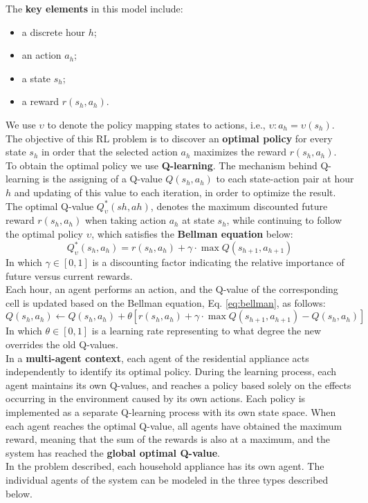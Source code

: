 The \textbf{key elements} in this model include:
\begin{itemize}
    \item a discrete hour $h$;
    \item an action $a_h$;
    \item a state $s_h$;
    \item a reward $r(s_h, a_h)$.
\end{itemize}
We use $\upsilon$ to denote the policy mapping states to actions, i.e., $\upsilon:a_h=\upsilon(s_h)$. The objective of this RL problem is to discover an \textbf{optimal policy} for every state $s_h$ in order that the selected action $a_h$ maximizes the reward $r(s_h, a_h)$.\\
To obtain the optimal policy we use \textbf{Q-learning}. The mechanism behind Q-learning is the assigning of a Q-value $Q(s_h, a_h)$ to each state-action pair at hour $h$ and updating of this value to each iteration, in order to optimize the result. The optimal Q-value $Q^{\ast}_\upsilon(sh, ah)$, denotes the maximum discounted future reward $r(s_h, a_h)$ when taking action $a_h$ at state $s_h$, while continuing to follow the optimal policy $\upsilon$, which satisfies the \textbf{Bellman equation} below:
\begin{equation}
\label{eq:bellman}
Q^{\ast}_\upsilon(s_h, a_h)=r(s_h,a_h)+\gamma \cdot \max Q(s_{h+1}, a_{h+1})
\end{equation}
In which $\gamma \in [0,1]$ is a discounting factor indicating the relative importance of future versus current rewards.\\
Each hour, an agent performs an action, and the Q-value of the corresponding cell is updated based on the Bellman equation, Eq. \ref{eq:bellman}, as follows:
\begin{equation}
    Q(s_h, a_h) \leftarrow Q(s_h, a_h)+\theta[r(s_h, a_h)+\gamma \cdot \max Q(s_{h+1}, a_{h+1})-Q(s_h, a_h)]
\end{equation}
In which $\theta \in [0,1]$ is a learning rate representing to what degree the new overrides the old Q-values.\\
In a \textbf{multi-agent context}, each agent of the residential appliance acts independently to identify its optimal policy. During the learning process, each agent maintains its own Q-values, and reaches a policy based solely on the effects occurring in the environment caused by its own actions. Each policy is implemented as a separate Q-learning process with its own state space. When each agent reaches the optimal Q-value, all agents have obtained the maximum reward, meaning that the sum of the rewards is also at a maximum, and the system has reached the \textbf{global optimal Q-value}.\\
In the problem described, each household appliance has its own agent. The individual agents of the system can be modeled in the three types described below.

